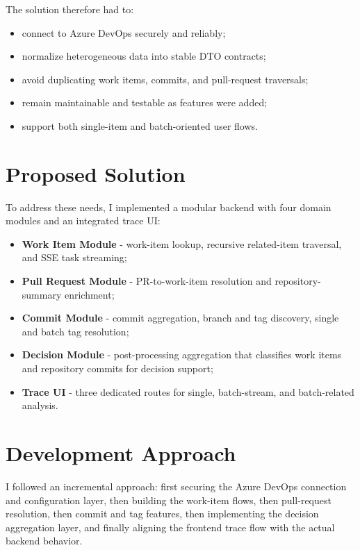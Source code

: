 \documentclass[12pt,a4paper]{report}
\begin{document}
\medskip
The solution therefore had to:
\begin{itemize}
  \item connect to Azure DevOps securely and reliably;
  \item normalize heterogeneous data into stable DTO contracts;
  \item avoid duplicating work items, commits, and pull-request traversals;
  \item remain maintainable and testable as features were added;
  \item support both single-item and batch-oriented user flows.
\end{itemize}

\section{Proposed Solution}

To address these needs, I implemented a modular backend with four domain modules
and an integrated trace UI:

\begin{itemize}
  \item \textbf{Work Item Module} - work-item lookup, recursive related-item traversal, and SSE task streaming;
  \item \textbf{Pull Request Module} - PR-to-work-item resolution and repository-summary enrichment;
  \item \textbf{Commit Module} - commit aggregation, branch and tag discovery, single and batch tag resolution;
  \item \textbf{Decision Module} - post-processing aggregation that classifies work items and repository commits for decision support;
  \item \textbf{Trace UI} - three dedicated routes for single, batch-stream, and batch-related analysis.
\end{itemize}

\section{Development Approach}

I followed an incremental approach: first securing the Azure DevOps connection
and configuration layer, then building the work-item flows, then pull-request
resolution, then commit and tag features, then implementing the decision
aggregation layer, and finally aligning the frontend trace flow with the actual
backend behavior.
\end{document}
